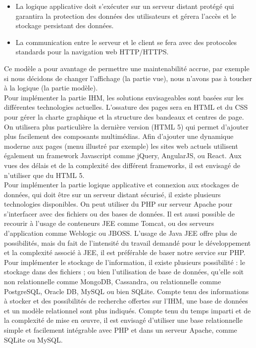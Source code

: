 \documentclass[a4paper,11pt]{article}
\begin{document}
\begin{itemize}
  \item La logique applicative doit s’exécuter sur un serveur distant protégé qui garantira la protection
  des données des utilisateurs et gérera l’accès et le stockage persistant des données.
  \item La communication entre le serveur et le client se fera avec des protocoles standards pour la
  navigation web HTTP/HTTPS.
\end{itemize}

Ce modèle a pour avantage de permettre une maintenabilité accrue, par exemple si nous décidons de
changer l’affichage (la partie vue), nous n’avons pas à toucher à la logique (la partie modèle).\\

Pour implémenter la partie IHM, les solutions envisageables sont basées sur les différentes
technologies actuelles.
L’ossature des pages sera en HTML et du CSS pour gérer la charte graphique et la structure des
bandeaux et centres de page. On utilisera plus particulière la dernière version (HTML 5) qui permet
d’ajouter plus facilement des composants multimédias. Afin d’ajouter une dynamique moderne aux
pages (menu illustré par exemple) les sites web actuels utilisent également un framework Javascript
comme jQuery, AngularJS, ou React. Aux vues des délais et de la complexité des différent frameworks,
il est envisagé de n’utiliser que du HTML 5.\\

Pour implémenter la partie logique applicative et connexion aux stockages de données, qui doit être
sur un serveur distant sécurisé, il existe plusieurs technologies disponibles. On peut utiliser du PHP sur
serveur Apache pour s’interfacer avec des fichiers ou des bases de données. Il est aussi possible de
recourir à l’usage de conteneurs JEE comme Tomcat, ou des serveurs d’application comme Weblogic
ou JBOSS. L’usage de Java JEE offre plus de possibilités, mais du fait de l’intensité du travail demandé
pour le développement et la complexité associé à JEE, il est préférable de baser notre service sur PHP.
Pour implémenter le stockage de l’information, il existe plusieurs possibilité : le stockage dans des
fichiers ; ou bien l’utilisation de base de données, qu’elle soit non relationnelle comme MongoDB,
Cassandra, ou relationnelle comme PostgreSQL, Oracle DB, MySQL ou bien SQLite. Compte tenu des
informations à stocker et des possibilités de recherche offertes sur l’IHM, une base de données et un
modèle relationnel sont plus indiqués. Compte tenu du temps imparti et de la complexité de mise en
œuvre, il est envisagé d’utiliser une base relationnelle simple et facilement intégrable avec PHP et
dans un serveur Apache, comme SQLite ou MySQL.\\
\end{document}
